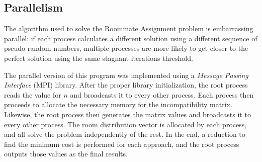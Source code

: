 \subsection{Parallelism}
\label{sec:parallelism}
The algorithm used to solve the Roommate Assignment problem is embarrassing parallel: if each process calculates a different solution using a different sequence of pseudo-random numbers, multiple processes are more likely to get closer to the perfect solution using the same stagnant iterations threshold.

The parallel version of this program was implemented using a \textit{Message Passing Interface} (MPI) library. After the proper library initialization, the root process reads the value for $n$ and broadcasts it to every other process. Each process then proceeds to allocate the necessary memory for the incompatibility matrix. Likewise, the root process then generates the matrix values and broadcasts it to every other process. The room distribution vector is allocated by each process, and all solve the problem independently of the rest. In the end, a reduction to find the minimum cost is performed for each approach, and the root process outputs those values as the final results.